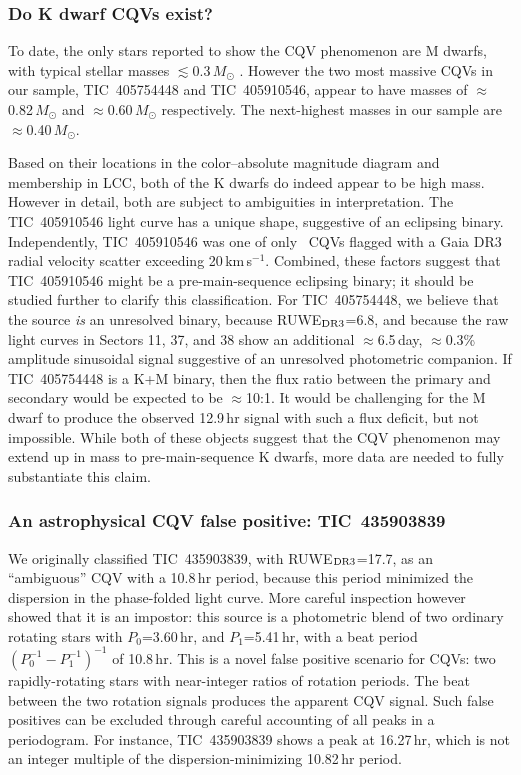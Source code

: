 \documentclass[11pt,twocolumn,tighten]{aastex63}
\newcommand{\kms}{{km\,s$^{-1}$}}
\begin{document}
\subsubsection{Do K dwarf CQVs exist?}
\label{subsec:massive}

To date, the only stars reported to show the CQV phenomenon are M
dwarfs, with typical stellar masses $\lesssim$0.3\,$M_\odot$
\citep{2017AJ....153..152S,2022AJ....163..144G}.  However the two most
massive CQVs in our sample, TIC~405754448 and TIC~405910546, appear to
have masses of $\approx$0.82\,$M_\odot$ and $\approx$0.60\,$M_\odot$
respectively.  The next-highest masses in our sample are
$\approx$0.40\,$M_\odot$.

Based on their locations in the color--absolute magnitude
diagram and membership in LCC, both of the K dwarfs do indeed appear
to be high mass.  However in detail, both are subject to ambiguities
in interpretation.  The TIC~405910546 light curve has a unique shape,
suggestive of an eclipsing binary.  Independently, TIC~405910546 was
one of only \nrvscatterflag\ CQVs flagged with a Gaia DR3 radial
velocity scatter exceeding 20\,\kms.  Combined, these factors suggest
that TIC~405910546 might be a pre-main-sequence eclipsing binary; it
should be studied further to clarify this classification.  For
TIC~405754448, we believe that the source {\it is} an unresolved
binary, because RUWE$_{\rm DR3}$=6.8, and because the raw light curves
in Sectors 11, 37, and 38 show an additional $\approx$6.5\,day,
$\approx$0.3\% amplitude sinusoidal signal suggestive of an unresolved
photometric companion.  If TIC~405754448 is a K+M binary, then the
flux ratio between the primary and secondary would be expected to be
$\approx$10:1.  It would be challenging for the M dwarf to produce the
observed 12.9\,hr signal with such a flux deficit, but not impossible.
While both of these objects suggest that the CQV phenomenon may extend
up in mass to pre-main-sequence K dwarfs, more data are needed to
fully substantiate this claim.

\subsubsection{An astrophysical CQV false positive: TIC~435903839}

We originally classified TIC~435903839, with RUWE$_{\rm DR3}$=17.7, as
an ``ambiguous'' CQV with a 10.8\,hr period, because this period
minimized the dispersion in the phase-folded light curve.  More
careful inspection however showed that it is an impostor:
this source is a photometric blend of two ordinary rotating stars with
$P_0$=3.60\,hr, and $P_1$=5.41\,hr, with a beat period $(P_0^{-1} -
P_1^{-1})^{-1}$ of 10.8\,hr.  This is a novel false positive scenario
for CQVs: two rapidly-rotating stars with near-integer ratios of
rotation periods.  The beat between the two rotation signals produces
the apparent CQV signal.  Such false positives can be excluded through
careful accounting of all peaks in a periodogram.  For instance,
TIC~435903839 shows a peak at 16.27\,hr, which is not an integer
multiple of the dispersion-minimizing 10.82\,hr period.
\end{document}
